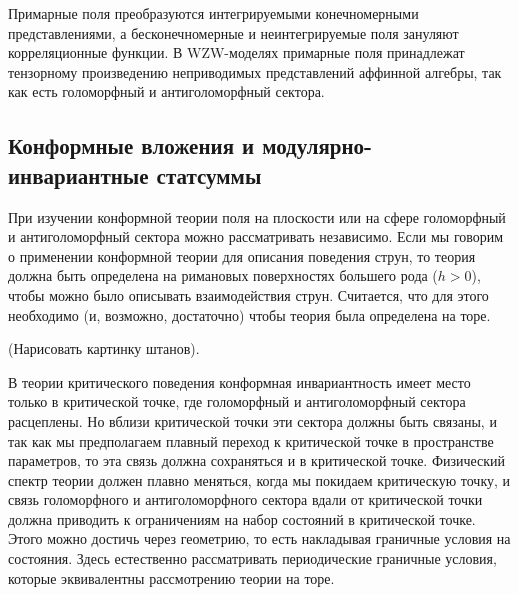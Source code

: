 \documentclass[a4paper,12pt]{article}
\theoremstyle{definition} \newtheorem{Def}{Definition}
\begin{document}
Примарные поля преобразуются  интегрируемыми конечномерными представлениями, а бесконечномерные и
неинтегрируемые поля зануляют корреляционные функции.
В WZW-моделях примарные поля
принадлежат тензорному произведению неприводимых представлений аффинной алгебры, так как есть
голоморфный и антиголоморфный сектора.


\subsection{Конформные вложения и модулярно-инвариантные статсуммы}
\label{sec:modular-invariance}

При изучении конформной теории поля на плоскости или на сфере 
голоморфный и антиголоморфный сектора можно рассматривать независимо. 
Если мы говорим о применении конформной теории для описания поведения струн, то теория должна быть
определена на римановых поверхностях большего рода ($h>0$), чтобы можно было описывать
взаимодействия струн. Считается, что для этого необходимо (и, возможно, достаточно) чтобы теория была определена на торе.

(Нарисовать картинку штанов).

В теории критического поведения конформная инвариантность имеет место только в критической точке,
где голоморфный и антиголоморфный сектора расцеплены. Но вблизи критической точки эти сектора должны
быть связаны, и так как мы предполагаем плавный переход к критической точке в пространстве
параметров, то эта связь должна сохраняться и в критической точке. Физический спектр теории должен
плавно меняться, когда мы покидаем критическую точку, и связь голоморфного и антиголоморфного
сектора вдали от критической точки должна приводить к ограничениям на набор состояний в критической
точке. Этого можно достичь через геометрию, то есть накладывая граничные условия на состояния. Здесь
естественно рассматривать периодические граничные условия, которые эквивалентны рассмотрению теории
на торе.
\end{document}

